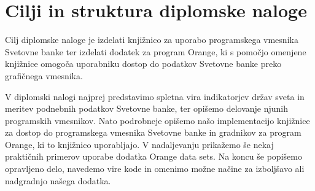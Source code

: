 \section{Cilji in struktura diplomske naloge}

Cilj diplomske naloge je izdelati knjižnico za uporabo programskega vmesnika
Svetovne banke ter izdelati dodatek za program Orange, ki s pomočjo omenjene
knjižnice omogoča uporabniku dostop do podatkov Svetovne banke preko
grafičnega vmesnika.

V diplomski nalogi najprej predstavimo spletna vira indikatorjev
držav sveta in meritev podnebnih podatkov Svetovne banke, ter
opišemo delovanje njunih programskih vmesnikov.
Nato podrobneje opišemo našo implementacijo knjižnice za dostop do
programskega vmesnika Svetovne banke in gradnikov za program Orange, ki to
knjižnico uporabljajo. V nadaljevanju prikažemo še nekaj praktičnih 
primerov uporabe dodatka Orange data sets. Na koncu še popišemo opravljeno 
delo, navedemo vire kode in omenimo možne načine za izboljšavo ali 
nadgradnjo našega dodatka.














